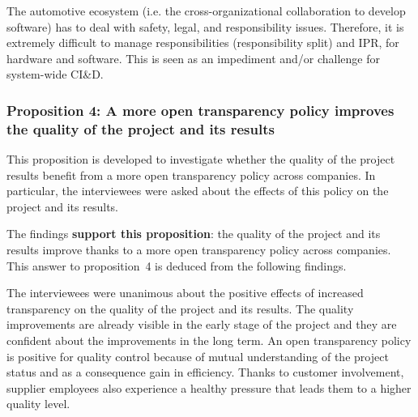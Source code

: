  The automotive %
ecosystem %
{(i.e. the cross-organizational collaboration to develop software)} has to deal with safety, legal, and responsibility issues. Therefore, it is extremely difficult to manage responsibilities (responsibility split) and IPR, for hardware and software. This is seen as an impediment and/or challenge for system-wide CI\&D.

\vspace{.2cm}
\subsubsection{Proposition 4: A more open transparency policy improves the quality of the project and its results}

%
%
%

This proposition is developed to investigate whether the quality of the project results benefit from a more open transparency policy across companies. In particular, the interviewees were asked about the effects of this policy on the project and its results.

The findings {\bf support this proposition}:  the quality of the project and its results improve thanks to a more open transparency policy across companies. This answer to proposition~4 is deduced from the following findings.

 The interviewees were unanimous about the positive effects of increased transparency on the quality of the project and its results. The quality improvements are already visible in the early stage of the project and they are confident about the improvements in the long term. An open transparency policy is positive for quality control because of mutual understanding of the project status and as a consequence gain in efficiency. Thanks to customer involvement, supplier employees also experience a healthy pressure that leads them to a higher quality level.

